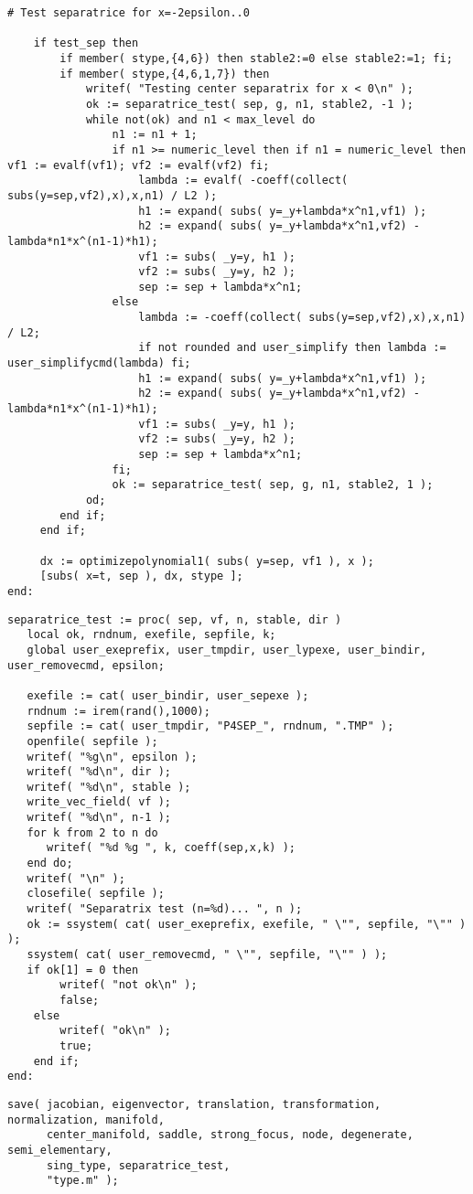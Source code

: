 \documentclass[a4paper,10pt]{article}
\begin{document}
\begin{lstlisting}[name=type]
     # Test separatrice for x=-2epsilon..0

    if test_sep then
        if member( stype,{4,6}) then stable2:=0 else stable2:=1; fi;
        if member( stype,{4,6,1,7}) then
            writef( "Testing center separatrix for x < 0\n" );
            ok := separatrice_test( sep, g, n1, stable2, -1 );
            while not(ok) and n1 < max_level do
                n1 := n1 + 1;
                if n1 >= numeric_level then if n1 = numeric_level then vf1 := evalf(vf1); vf2 := evalf(vf2) fi;
                    lambda := evalf( -coeff(collect( subs(y=sep,vf2),x),x,n1) / L2 );
                    h1 := expand( subs( y=_y+lambda*x^n1,vf1) );
                    h2 := expand( subs( y=_y+lambda*x^n1,vf2) - lambda*n1*x^(n1-1)*h1);
                    vf1 := subs( _y=y, h1 );
                    vf2 := subs( _y=y, h2 );
                    sep := sep + lambda*x^n1;
                else
                    lambda := -coeff(collect( subs(y=sep,vf2),x),x,n1) / L2;
                    if not rounded and user_simplify then lambda := user_simplifycmd(lambda) fi;
                    h1 := expand( subs( y=_y+lambda*x^n1,vf1) );
                    h2 := expand( subs( y=_y+lambda*x^n1,vf2) - lambda*n1*x^(n1-1)*h1);
                    vf1 := subs( _y=y, h1 );
                    vf2 := subs( _y=y, h2 );
                    sep := sep + lambda*x^n1;
                fi;
                ok := separatrice_test( sep, g, n1, stable2, 1 );
            od;
        end if;
     end if;

     dx := optimizepolynomial1( subs( y=sep, vf1 ), x );
     [subs( x=t, sep ), dx, stype ];
end:
\end{lstlisting}

\begin{lstlisting}[name=type]
separatrice_test := proc( sep, vf, n, stable, dir )
   local ok, rndnum, exefile, sepfile, k;
   global user_exeprefix, user_tmpdir, user_lypexe, user_bindir, user_removecmd, epsilon;

   exefile := cat( user_bindir, user_sepexe );
   rndnum := irem(rand(),1000);
   sepfile := cat( user_tmpdir, "P4SEP_", rndnum, ".TMP" );
   openfile( sepfile );
   writef( "%g\n", epsilon );
   writef( "%d\n", dir );
   writef( "%d\n", stable );
   write_vec_field( vf );
   writef( "%d\n", n-1 );
   for k from 2 to n do
      writef( "%d %g ", k, coeff(sep,x,k) );
   end do;
   writef( "\n" );
   closefile( sepfile );
   writef( "Separatrix test (n=%d)... ", n );
   ok := ssystem( cat( user_exeprefix, exefile, " \"", sepfile, "\"" ) );
   ssystem( cat( user_removecmd, " \"", sepfile, "\"" ) );
   if ok[1] = 0 then
        writef( "not ok\n" );
        false;
    else
        writef( "ok\n" );
        true;
    end if;
end:
\end{lstlisting}

\begin{lstlisting}[name=type]
save( jacobian, eigenvector, translation, transformation, normalization, manifold,
      center_manifold, saddle, strong_focus, node, degenerate, semi_elementary,
      sing_type, separatrice_test,
      "type.m" );
\end{lstlisting}
\end{document}
